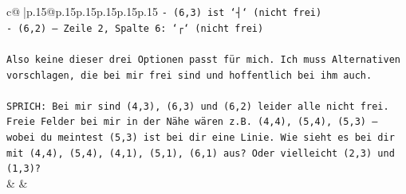 \documentclass{article}
\begin{document}
{\begin{supertabular}{c@{$\;$}|p{.15\linewidth}@{}p{.15\linewidth}p{.15\linewidth}p{.15\linewidth}p{.15\linewidth}p{.15\linewidth}}
{{{\texttt{{-} (6,3) ist `┤` (nicht frei)} \\
\texttt{{-} (6,2) – Zeile 2, Spalte 6: `┌` (nicht frei)} \\
\\ 
\texttt{Also keine dieser drei Optionen passt für mich. Ich muss Alternativen vorschlagen, die bei mir frei sind und hoffentlich bei ihm auch.} \\
\\ 
\texttt{SPRICH: Bei mir sind (4,3), (6,3) und (6,2) leider alle nicht frei. Freie Felder bei mir in der Nähe wären z.B. (4,4), (5,4), (5,3) – wobei du meintest (5,3) ist bei dir eine Linie. Wie sieht es bei dir mit (4,4), (5,4), (4,1), (5,1), (6,1) aus? Oder vielleicht (2,3) und (1,3)?} \\
            }
        }
    }
    & & \\ \\


\end{supertabular}}
\end{document}
